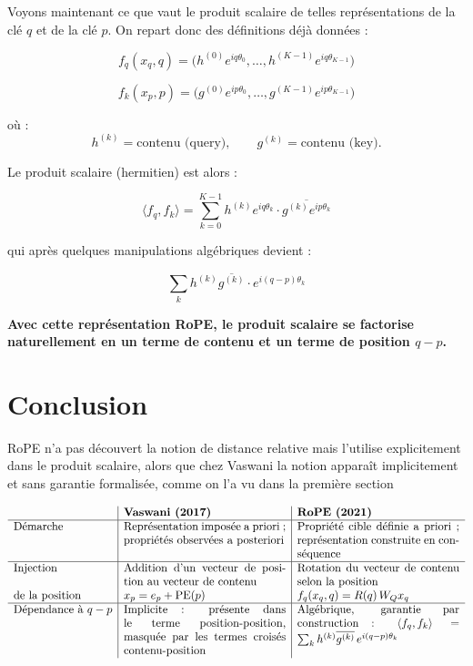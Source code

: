 \documentclass{article}
\begin{document}
Voyons maintenant ce que vaut le produit scalaire de telles représentations de la clé $q$ et de la clé $p$. On repart donc des définitions déjà données :


\[
f_q(x_q,q)
=
\big(
h^{(0)} e^{i q \theta_0},
\ldots,
h^{(K-1)} e^{i q \theta_{K-1}}
\big)
\]

\[
f_k(x_p,p)
=
\big(
g^{(0)} e^{i p \theta_0},
\ldots,
g^{(K-1)} e^{i p \theta_{K-1}}
\big)
\]

où :
\[
h^{(k)} = \text{contenu (query)}, \qquad
g^{(k)} = \text{contenu (key)}.
\]

Le produit scalaire (hermitien) est alors :

\[
\langle f_q, f_k \rangle
=
\sum_{k=0}^{K-1}
h^{(k)} e^{i q \theta_k}
\cdot
\overline{g^{(k)} e^{i p \theta_k}}
\]

qui après quelques manipulations algébriques devient :

\[
\sum_{k}
h^{(k)} \overline{g^{(k)}} \cdot e^{i (q-p)\theta_k}
\]


\textbf{Avec cette représentation RoPE, le produit scalaire se factorise naturellement en un terme de contenu et un terme de position $q-p$.}


\section{Conclusion}

RoPE n'a pas découvert la notion de distance relative mais l'utilise explicitement dans le produit scalaire, alors que chez Vaswani la notion apparaît implicitement et sans garantie formalisée, comme on l'a vu dans la première section



\[
\begin{array}{l|p{5cm}|p{5cm}}
 & \textbf{Vaswani (2017)} & \textbf{RoPE (2021)} \\
\hline
\text{Démarche}
  & Représentation imposée a priori ; propriétés observées a posteriori
  & Propriété cible définie a priori ; représentation construite en conséquence \\
\hline
\text{Injection}
  & Addition d'un vecteur de position au vecteur de contenu
  & Rotation du vecteur de contenu selon la position \\
\text{de la position}
  & $x_p = e_p + \mathrm{PE}(p)$
  & $f_q(x_q,q) = R(q)\,W_Q x_q$ \\
\hline
\text{Dépendance à } q-p
  & Implicite : présente dans le terme position-position, masquée par les termes croisés contenu-position
  & Algébrique, garantie par construction :
    $\langle f_q, f_k \rangle = \sum_k h^{(k)}\overline{g^{(k)}}\, e^{i(q-p)\theta_k}$ \\
\end{array}
\]
\end{document}
